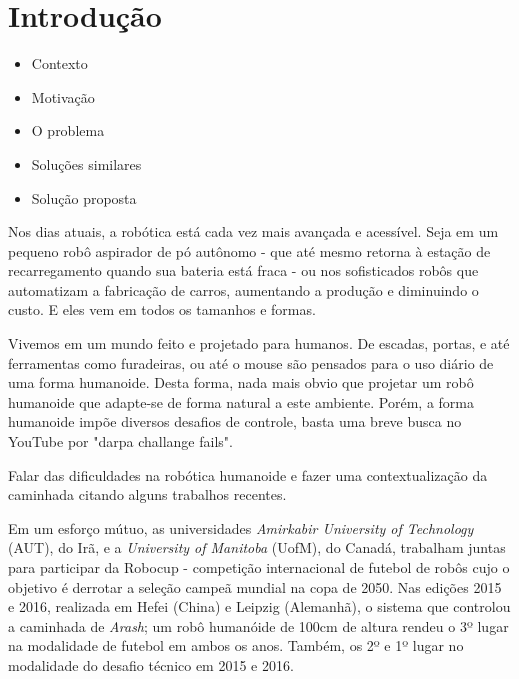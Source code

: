 \chapter{Introdução}

\begin{guide}
	\begin{itemize}
		\item Contexto
		\item Motivação
		\item O problema
		\item Soluções similares
		\item Solução proposta
	\end{itemize}
\end{guide}


\begin{draft}
Nos dias atuais, a robótica está cada vez mais avançada e acessível. Seja em um pequeno robô aspirador de pó autônomo - que até mesmo retorna à estação de recarregamento quando sua bateria está fraca - ou nos sofisticados robôs que automatizam a fabricação de carros, aumentando a produção e diminuindo o custo. E eles vem em todos os tamanhos e formas.
\end{draft}

Vivemos em um mundo feito e projetado para humanos. De escadas, portas, e até ferramentas como furadeiras, ou até o mouse são pensados para o uso diário de uma forma humanoide. Desta forma, nada mais obvio que projetar um robô humanoide que adapte-se de forma natural a este ambiente. Porém, a forma humanoide impõe diversos desafios de controle, basta uma breve busca no YouTube por "darpa challange fails".

\begin{guide}
	Falar das dificuldades na robótica humanoide e fazer uma contextualização
	da caminhada citando alguns trabalhos recentes.
\end{guide}

Em um esforço mútuo, as universidades \textit{Amirkabir University of Technology} (AUT), do Irã, e a \textit{University of Manitoba} (UofM), do Canadá, trabalham juntas para participar da Robocup - competição internacional de futebol de robôs cujo o objetivo é derrotar a seleção campeã mundial na copa de 2050. Nas edições 2015 e 2016, realizada em Hefei (China) e Leipzig (Alemanhã), o sistema que controlou a caminhada de \textit{Arash}; um robô humanóide de 100cm de altura rendeu o 3º lugar na modalidade de futebol em ambos os anos. Também, os 2º e 1º lugar no modalidade do desafio técnico em 2015 e 2016.

